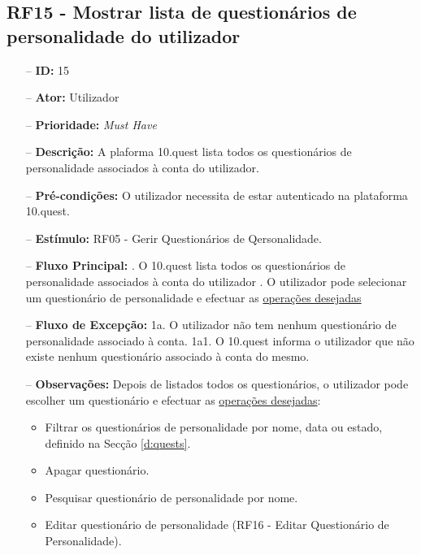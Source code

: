 \subsection{RF15 - Mostrar lista de questionários de personalidade do utilizador}
\begin{itemize}
	\item[--] \textbf{ID:} 15
	\item[--]  \textbf{Ator:} Utilizador
	\item[--]  \textbf{Prioridade:} \textit{Must Have}
	\item[--]  \textbf{Descrição:} A plaforma 10.quest lista todos os questionários de personalidade associados à conta do utilizador.
	\item[--]  \textbf{Pré-condições:} O utilizador necessita de estar autenticado na plataforma 10.quest.
	\item[--]  \textbf{Estímulo:} RF05 - Gerir Questionários de Qersonalidade.
	\item[--]  \textbf{Fluxo Principal:} 
		. O 10.quest lista todos os questionários de personalidade associados à conta do utilizador
		. O utilizador pode selecionar um questionário de personalidade e efectuar as \underline{operações desejadas}
	\item[--]  \textbf{Fluxo de Excepção:} 
		\subitem 1a. O utilizador não tem nenhum questionário de personalidade associado à conta.
		\subitem 1a1. O 10.quest informa o utilizador que não existe nenhum questionário associado à conta do mesmo.
	\item[--]  \textbf{Observações:} Depois de listados todos os questionários, o utilizador pode escolher um questionário e efectuar as \underline{operações desejadas}:
	\begin{itemize}
		\item Filtrar os questionários de personalidade por nome, data ou estado, definido na Secção \ref{d:quests}.
		\item Apagar questionário.
		\item Pesquisar questionário de personalidade por nome.
		\item Editar questionário de personalidade (RF16 - Editar Questionário de Personalidade).
	\end{itemize}
\end{itemize}
\newpage


